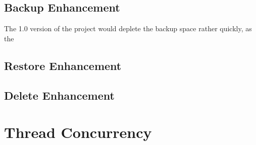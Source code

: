 \documentclass[11pt]{article}
\begin{document}
\subsection{Backup Enhancement}
The 1.0 version of the project would deplete the backup space rather quickly, as the 


\subsection{Restore Enhancement}


\subsection{Delete Enhancement}

\section{Thread Concurrency}




	
\end{document}
